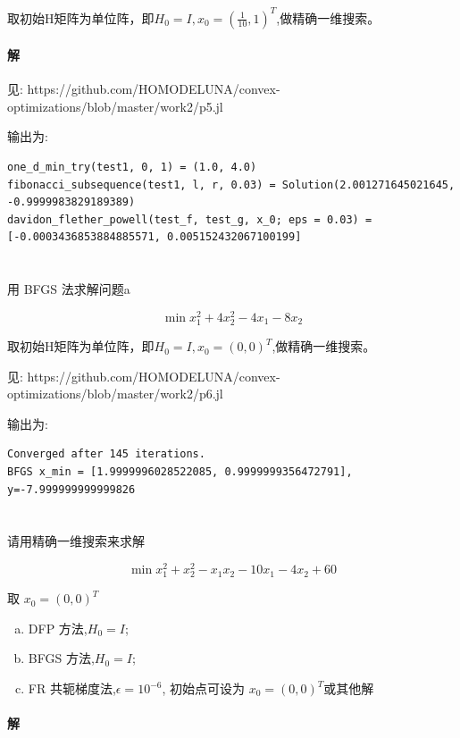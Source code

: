 \documentclass[a4paper]{article}
\begin{document}
取初始H矩阵为单位阵，即$H_0 = I, x_0 = (\frac{1}{10},1)^T$,做精确一维搜索。

\paragraph{解}

见: https://github.com/HOMODELUNA/convex-optimizations/blob/master/work2/p5.jl

输出为:
\begin{lstlisting}
one_d_min_try(test1, 0, 1) = (1.0, 4.0)
fibonacci_subsequence(test1, l, r, 0.03) = Solution(2.001271645021645, -0.9999983829189389)
davidon_flether_powell(test_f, test_g, x_0; eps = 0.03) = [-0.0003436853884885571, 0.005152432067100199]
\end{lstlisting}

\section{}

用 BFGS 法求解问题a

\[\min x_1^2 + 4x_2^2 - 4x_1 -8x_2\]

取初始H矩阵为单位阵，即$H_0 = I, x_0 = (0,0)^T$,做精确一维搜索。


见: https://github.com/HOMODELUNA/convex-optimizations/blob/master/work2/p6.jl

输出为:
\begin{lstlisting}
Converged after 145 iterations.
BFGS x_min = [1.9999996028522085, 0.9999999356472791], y=-7.999999999999826
\end{lstlisting}

\section{}

请用精确一维搜索来求解

\[\min x_1^2 + x_2^2 - x_1x_2 -10x_1 - 4x_2 + 60\]

取 $x_0 = (0,0)^T$

\begin{enumerate}[(a)]
    \item DFP 方法,$H_0 = I$;
    \item BFGS 方法,$H_0 = I$;
    \item FR 共轭梯度法,$\epsilon = 10^{-6}$, 初始点可设为 $x_0 = (0,0)^T$或其他解
\end{enumerate}

\paragraph{解}
\end{document}
